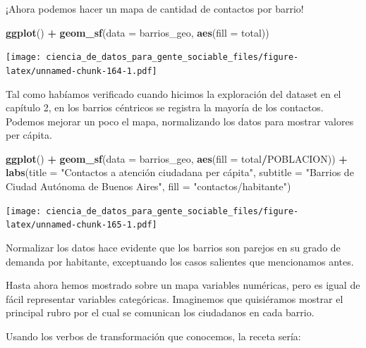 \documentclass[spanish,]{book}
\newenvironment{Shaded}{\begin{snugshade}}{\end{snugshade}}
\newcommand{\DataTypeTok}[1]{\textcolor[rgb]{0.13,0.29,0.53}{#1}}
\newcommand{\KeywordTok}[1]{\textcolor[rgb]{0.13,0.29,0.53}{\textbf{#1}}}
\newcommand{\NormalTok}[1]{#1}
\newcommand{\OperatorTok}[1]{\textcolor[rgb]{0.81,0.36,0.00}{\textbf{#1}}}
\newcommand{\StringTok}[1]{\textcolor[rgb]{0.31,0.60,0.02}{#1}}
\begin{document}
¡Ahora podemos hacer un mapa de cantidad de contactos por barrio!

\begin{Shaded}
\begin{Highlighting}[]
\KeywordTok{ggplot}\NormalTok{() }\OperatorTok{+}\StringTok{ }\KeywordTok{geom_sf}\NormalTok{(}\DataTypeTok{data =}\NormalTok{ barrios_geo, }\KeywordTok{aes}\NormalTok{(}\DataTypeTok{fill =}\NormalTok{ total))}
\end{Highlighting}
\end{Shaded}

\texttt{[image: ciencia\_de\_datos\_para\_gente\_sociable\_files/figure-latex/unnamed-chunk-164-1.pdf]}

Tal como habíamos verificado cuando hicimos la exploración del dataset en el capítulo 2, en los barrios céntricos se registra la mayoría de los contactos. Podemos mejorar un poco el mapa, normalizando los datos para mostrar valores per cápita.

\begin{Shaded}
\begin{Highlighting}[]
\KeywordTok{ggplot}\NormalTok{() }\OperatorTok{+}\StringTok{ }
\StringTok{    }\KeywordTok{geom_sf}\NormalTok{(}\DataTypeTok{data =}\NormalTok{ barrios_geo, }\KeywordTok{aes}\NormalTok{(}\DataTypeTok{fill =}\NormalTok{ total}\OperatorTok{/}\NormalTok{POBLACION)) }\OperatorTok{+}
\StringTok{    }\KeywordTok{labs}\NormalTok{(}\DataTypeTok{title =} \StringTok{"Contactos a atención ciudadana per cápita"}\NormalTok{,}
         \DataTypeTok{subtitle =} \StringTok{"Barrios de Ciudad Autónoma de Buenos Aires"}\NormalTok{,}
         \DataTypeTok{fill =} \StringTok{"contactos/habitante"}\NormalTok{)}
\end{Highlighting}
\end{Shaded}

\texttt{[image: ciencia\_de\_datos\_para\_gente\_sociable\_files/figure-latex/unnamed-chunk-165-1.pdf]}

Normalizar los datos hace evidente que los barrios son parejos en su grado de demanda por habitante, exceptuando los casos salientes que mencionamos antes.

Hasta ahora hemos mostrado sobre un mapa variables numéricas, pero es igual de fácil representar variables categóricas. Imaginemos que quisiéramos mostrar el principal rubro por el cual se comunican los ciudadanos en cada barrio.

Usando los verbos de transformación que conocemos, la receta sería:
\end{document}
